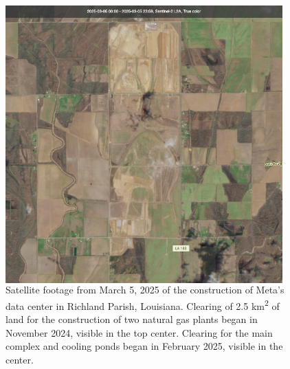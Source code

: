 \documentclass[aspectratio=169]{beamer}
\begin{document}
    \begin{frame}
        \begin{figure}
            \begin{columns}[c]
                \begin{column}{0.5\textwidth}
                    \vspace{7pt}
                    \includegraphics[height=1.2\textwidth]{images/meta_richland_parish_louisiana_satellite_footage}
                \end{column}
                \begin{column}{0.45\textwidth}
                    \caption{Satellite footage from March 5, 2025 of the construction of Meta's data center in Richland Parish, Louisiana. Clearing of 2.5 km\textsuperscript{2} of land for the construction of two natural gas plants began in November 2024, visible in the top center. Clearing for the main complex and cooling ponds began in February 2025, visible in the center.~\parencite{copernicus_browser_2025}}
                \end{column}
            \end{columns}
        \end{figure}
    \end{frame}
\end{document}

